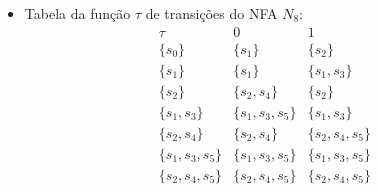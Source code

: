 \documentclass[12pt]{article}
\def\myling{{8}} %
\begin{document}
\begin{tcolorbox}[rounded corners, colback=yellow!5, colframe=red!40!black, title={Elementos da transformação NFA/NFA-$\varepsilon\rightarrow$ DFA}]
 \begin{itemize}[leftmargin=*]
 \item Tabela da função $\tau$ de transições do NFA $N_\myling$:
 $$
  \begin{array}{c|cc}
   \tau & 0           & 1\\
   \hline
   \{s_0\}  & \{s_1\} & \{s_2\}\\
   \{s_1\}  & \{s_1\} & \{s_1,s_3\}\\
   \{s_2\}  & \{s_2,s_4\} & \{s_2\}\\
   \{s_1,s_3\}  & \{s_1,s_3,s_5\}  & \{s_1,s_3\}\\
   \{s_2,s_4\}  & \{s_2,s_4\} & \{s_2,s_4,s_5\}\\
   \{s_1,s_3,s_5\}  & \{s_1,s_3,s_5\} & \{s_1,s_3,s_5\}\\
   \{s_2,s_4,s_5\}  & \{s_2,s_4,s_5\} & \{s_2,s_4,s_5\}\\
  
  \end{array}
 $$
 \end{itemize}
\end{tcolorbox}\bigskip
\end{document}
